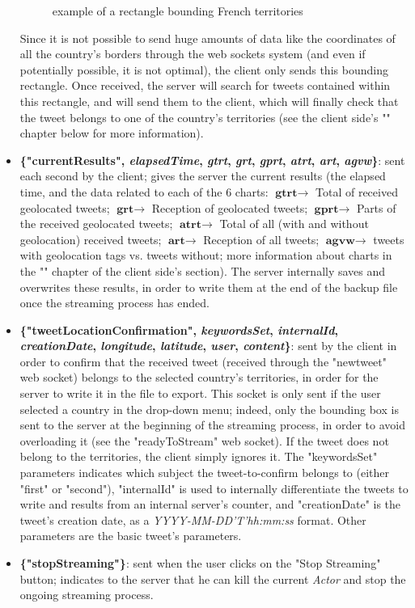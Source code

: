 \documentclass[a4paper,11pt]{report}
\begin{document}
\begin{itemize}
\begin{figure}[H]
\begin{center}
	\vspace{-5pt}
	\caption{example of a rectangle bounding French territories}
	\end{center}
	\end{figure}
	\vspace{-20pt}

	Since it is not possible to send huge amounts of data like the coordinates of all the country's borders through the web sockets system (and even if potentially possible, it is not optimal), the client only sends this bounding rectangle. Once received, the server will search for tweets contained within this rectangle, and will send them to the client, which will finally check that the tweet belongs to one of the country's territories (see the client side's "" chapter below for more information).

	\item \textbf{\{"currentResults", \textit{elapsedTime}, \textit{gtrt}, \textit{grt}, \textit{gprt}, \textit{atrt}, \textit{art}, \textit{agvw}\}}: sent each second by the client; gives the server the current results (the elapsed time, and the data related to each of the 6 charts: $\textbf{gtrt}\to$ Total of received geolocated tweets; $\textbf{grt}\to$ Reception of geolocated tweets; $\textbf{gprt}\to$ Parts of the received geolocated tweets; $\textbf{atrt}\to$ Total of all (with and without geolocation) received tweets; $\textbf{art}\to$ Reception of all tweets; $\textbf{agvw}\to$ tweets with geolocation tags vs. tweets without; more information about charts in the "" chapter of the client side's section). The server internally saves and overwrites these results, in order to write them at the end of the backup file once the streaming process has ended.
	
	\item \textbf{\{"tweetLocationConfirmation", \textit{keywordsSet}, \textit{internalId}, \textit{creationDate}, \textit{longitude}, \textit{latitude}, \textit{user}, \textit{content}\}}: sent by the client in order to confirm that the received tweet (received through the "newtweet" web socket) belongs to the selected country's territories, in order for the server to write it in the file to export. This socket is only sent if the user selected a country in the drop-down menu; indeed, only the bounding box is sent to the server at the beginning of the streaming process, in order to avoid overloading it (see the "readyToStream" web socket). If the tweet does not belong to the territories, the client simply ignores it. The "keywordsSet" parameters indicates which subject the tweet-to-confirm belongs to (either "first" or "second"), "internalId" is used to internally differentiate the tweets to write and results from an internal server's counter, and "creationDate" is the tweet's creation date, as a \emph{YYYY-MM-DD'T'hh:mm:ss} format. Other parameters are the basic tweet's parameters.
	\item \textbf{\{"stopStreaming"\}}: sent when the user clicks on the "Stop Streaming" button; indicates to the server that he can kill the current \emph{Actor} and stop the ongoing streaming process.
\end{itemize}
\end{document}
